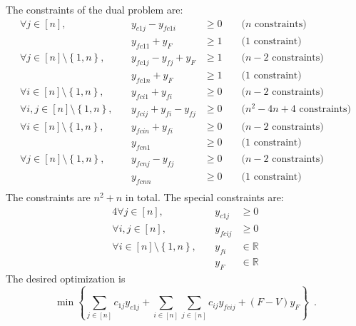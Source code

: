 The constraints of the dual problem are:
\begin{equation}
\label{lp:dual:constraints}
\begin{alignedat}{4}
  \forall j \in \left[n\right], && y_{c1j} - y_{fc1i} &\geq 0 &&\mbox{ ($n$ constraints)} \\
  && y_{fc11} + y_F &\geq 1 &&\mbox{ (1 constraint)} \\
  \forall j \in \left[n\right] \setminus \left\{1, n\right\}, &\:& y_{fc1j} - y_{fj} + y_F &\geq 1 &&
    \mbox{ ($n - 2$ constraints)} \\
  && y_{fc1n} + y_F &\geq 1 &&\mbox{ (1 constraint)} \\       
  \forall i \in \left[n\right] \setminus \left\{1, n\right\}, && y_{fci1} + y_{fi} &\geq 0 &&
    \mbox{ ($n - 2$ constraints)} \\
  \forall i, j \in \left[n\right] \setminus \left\{1, n\right\}, &\:& y_{fcij} + y_{fi} - y_{fj} &\geq 0 &&
    \mbox{ ($n^2 - 4n + 4$ constraints)} \\
  \forall i \in \left[n\right] \setminus \left\{1, n\right\}, && y_{fcin} + y_{fi} &\geq 0 &&
    \mbox{ ($n - 2$ constraints)} \\
  && y_{fcn1} &\geq 0 &&\mbox{ (1 constraint)} \\
  \forall j \in \left[n\right] \setminus \left\{1, n\right\}, && y_{fcnj} - y_{fj} &\geq 0 &&
    \mbox{ ($n - 2$ constraints)} \\
  && y_{fcnn} &\geq 0 &&\mbox{ (1 constraint)} \\
\end{alignedat}
\end{equation}
The constraints are $n^2 + n$ in total. The special constraints are:
\begin{alignat*}{4}
  \forall j \in \left[n\right], && y_{c1j} &\geq 0 \\
  \forall i, j \in \left[n\right], &\:& y_{fcij} &\geq 0 \\
  \forall i \in \left[n\right] \setminus \left\{1, n\right\}, && y_{fi} &\in \mathbb{R} \\
  && y_F &\in \mathbb{R}
\end{alignat*}
The desired optimization is
\begin{equation*}
  \min{\left\{\sum\limits_{j \in \left[n\right]}c_{1j}y_{c1j} + \sum\limits_{i \in \left[n\right]}\sum\limits_{j \in
       \left[n\right]}c_{ij}y_{fcij} + \left(F - V\right)y_F\right\}} \enspace.
\end{equation*}
